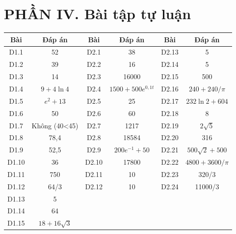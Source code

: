 \documentclass[12pt]{article}
\begin{document}
\section*{PHẦN IV. Bài tập tự luận}
\begin{center}
	\begin{tabular}{|c|c|c|c|c|c|}
		\hline
		\textbf{Bài} & \textbf{Đáp án} & \textbf{Bài} & \textbf{Đáp án} & \textbf{Bài} & \textbf{Đáp án} \\
		\hline
		D1.1 & 52 & D2.1 & 38 & D2.13 & 5 \\
		\hline
		D1.2 & 39 & D2.2 & 16 & D2.14 & 5 \\
		\hline
		D1.3 & 14 & D2.3 & 16000 & D2.15 & 500 \\
		\hline
		D1.4 & $9+4\ln 4$ & D2.4 & $1500 + 500e^{0,1t}$ & D2.16 & $240+240/\pi$ \\
		\hline
		D1.5 & $e^2+13$ & D2.5 & 25 & D2.17 & $232\ln 2 + 604$ \\
		\hline
		D1.6 & 50 & D2.6 & 60 & D2.18 & 8 \\
		\hline
		D1.7 & Không (40<45) & D2.7 & 1217 & D2.19 & $2\sqrt{5}$ \\
		\hline
		D1.8 & 78,4 & D2.8 & 18584 & D2.20 & 316 \\
		\hline
		D1.9 & 52,5 & D2.9 & $200e^{-1}+50$ & D2.21 & $500\sqrt{2}+500$ \\
		\hline
		D1.10 & 36 & D2.10 & 17800 & D2.22 & $4800+3600/\pi$ \\
		\hline
		D1.11 & 750 & D2.11 & 10 & D2.23 & 320/3 \\
		\hline
		D1.12 & 64/3 & D2.12 & 10 & D2.24 & 11000/3 \\
		\hline
		D1.13 & 5 & & & & \\
		\hline
		D1.14 & 64 & & & & \\
		\hline
		D1.15 & $18+16\sqrt{3}$ & & & & \\
		\hline
	\end{tabular}
\end{center}
\end{document}
